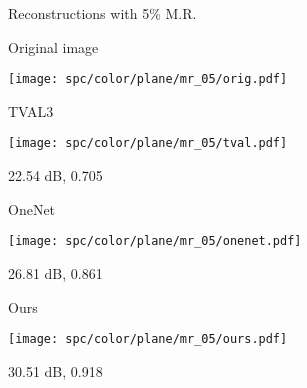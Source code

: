 \documentclass[journal,twoside]{IEEEtran}
\begin{document}
\begin{figure*}[t]
\begin{minipage}{.01\textwidth}
\raggedleft
\begin{turn}{90}Reconstructions with 5\% M.R. \end{turn}
\end{minipage}
\begin{minipage}{.98\textwidth}
\centering
\begin{minipage}{.20\textwidth}
\centerline{Original image}
\vspace{0.01cm}
\texttt{[image: spc/color/plane/mr\_05/orig.pdf]}  
\centerline{}
\end{minipage}\hspace{0.1cm}
\begin{minipage}{.20\textwidth}
\centerline{TVAL3}
\vspace{0.01cm}
\texttt{[image: spc/color/plane/mr\_05/tval.pdf]}  
\centerline{ 22.54 dB, 0.705}
\end{minipage}\hspace{0.1cm}
\begin{minipage}{.20\textwidth}
\centerline{OneNet}
\vspace{0.1cm}
\texttt{[image: spc/color/plane/mr\_05/onenet.pdf]}  
\centerline{ 26.81 dB, 0.861}
\end{minipage}\hspace{0.1cm}
\begin{minipage}{.20\textwidth}
\centerline{Ours}
\vspace{0.1cm}
\texttt{[image: spc/color/plane/mr\_05/ours.pdf]}  
\centerline{ 30.51 dB, 0.918}
\end{minipage}\\


\end{minipage}
\end{figure*}
\end{document}
